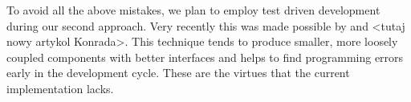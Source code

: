 To avoid all the above mistakes, we plan to employ test driven development during our second approach. Very recently this was made possible by \cite{TOSMock} and <tutaj nowy artykol Konrada>. This technique tends to produce smaller, more loosely coupled components with better interfaces and helps to find programming errors early in the development cycle. These are the virtues that the current implementation lacks.


